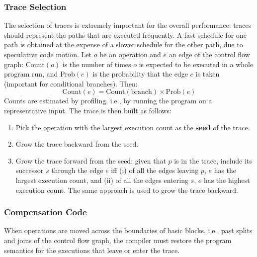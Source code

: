 \subsubsection{Trace Selection}
The selection of traces is extremely important for the overall performance: traces should represent the paths that are executed frequently. A fast schedule for one path is obtained at the expense of a slower schedule for the other path, due to speculative code motion. Let $o$ be an operation and $e$ an edge of the control flow graph: $\mathrm{Count}(o)$ is the number of times $o$ is expected to be executed in a whole program run, and $\mathrm{Prob}(e)$ is the probability that the edge $e$ is taken (important for conditional branches). Then:
\begin{equation}
    \mathrm{Count}(e) = \mathrm{Count}(\text{branch}) \times \mathrm{Prob}(e)
\end{equation}
Counts are estimated by profiling, i.e., by running the program on a representative input. The trace is then built as follows:
\begin{enumerate}
    \item Pick the operation with the largest execution count as the \textbf{seed} of the trace.
    \item Grow the trace backward from the seed.
    \item Grow the trace forward from the seed: given that $p$ is in the trace, include its successor $s$ through the edge $e$ iff (i) of all the edges leaving $p$, $e$ has the largest execution count, and (ii) of all the edges entering $s$, $e$ has the highest execution count. The same approach is used to grow the trace backward.
\end{enumerate}

\subsubsection{Compensation Code}
When operations are moved across the boundaries of basic blocks, i.e., past splits and joins of the control flow graph, the compiler must restore the program semantics for the executions that leave or enter the trace.

